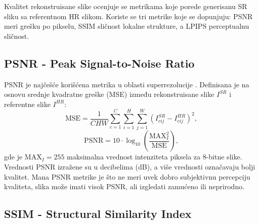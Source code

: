 \documentclass[12pt,a4paper]{article}
\begin{document}
Kvalitet rekonstruisane slike ocenjuje se metrikama koje porede generisanu SR sliku sa referentnom HR slikom. Koriste se tri metrike koje se dopunjuju: PSNR meri grešku po pikselu, SSIM sličnost lokalne strukture, a LPIPS perceptualnu sličnost.

\subsection{PSNR - Peak Signal-to-Noise Ratio}
\label{sec:psnr}

PSNR je najčešće korišćena metrika u oblasti superrezolucije \cite{SRSurvey}. Definisana je na osnovu srednje kvadratne greške (MSE) između rekonstruisane slike $I^{SR}$ i referentne slike $I^{HR}$:
\begin{equation}
    \text{MSE} = \frac{1}{CHW} \sum_{c=1}^{C}\sum_{i=1}^{H} \sum_{j=1}^{W} \left( I^{SR}_{cij} - I^{HR}_{cij} \right)^2,
\end{equation}
\begin{equation}
    \text{PSNR} = 10 \cdot \log_{10} \left( \frac{\mathrm{MAX}_I^2}{\text{MSE}} \right),
\end{equation}
gde je $\mathrm{MAX}_I = 255$ maksimalna vrednost intenziteta piksela za 8-bitne slike. Vrednosti PSNR izražene su u decibelima (dB), a više vrednosti označavaju bolji kvalitet. Mana PSNR metrike je što ne meri uvek dobro subjektivnu percepciju kvaliteta, slika može imati visok PSNR, ali izgledati zamućeno ili neprirodno.

\subsection{SSIM - Structural Similarity Index}
\end{document}
